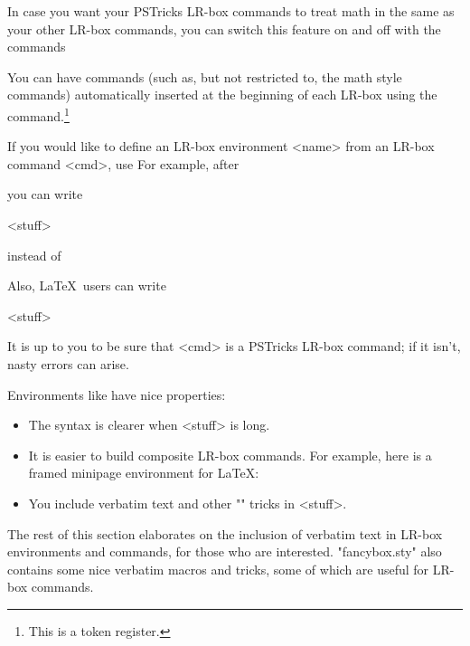   In case you want your PSTricks LR-box commands to treat math in the same as
your other LR-box commands, you can switch this feature on and off with the
commands
\begin{Ex}
  \object  \psmathboxtrue
  \object  \psmathboxfalse
\end{Ex}

You can  have commands (such as, but not restricted to, the math style
commands) automatically inserted at the beginning of each LR-box using the
  \Mac  {}
command.\footnote{This is a token register.}

If you would like to define an LR-box environment <name> from an LR-box
command <cmd>, use
  \Mac  {}
For example, after
\begin{LVerbatim}
\end{LVerbatim}
you can write
\begin{LVerbatim}
  \MyFrame <stuff>\endMyFrame
\end{LVerbatim}
instead of
\begin{LVerbatim}
\end{LVerbatim}
Also, \LaTeX\ users can write
\begin{LVerbatim}
  \begin{MyFrame} <stuff>\end{MyFrame}
\end{LVerbatim}
It is up to you to be sure that <cmd> is a PSTricks LR-box command; if it
isn't, nasty errors can arise.

Environments like have nice properties:
\begin{itemize}
  \item The syntax is clearer when <stuff> is long.
  \item It is easier to build composite LR-box commands. For example, here is
a framed minipage environment for \LaTeX:
\begin{LVerb}
  \newenvironment{fminipage}%
    {\MyFrame\begin{minipage}}%
    {\end{minipage}\endMyFrame}
\end{LVerb}
  \item You include verbatim text and other "\catcode" tricks in <stuff>.
\end{itemize}

The rest of this section elaborates on the inclusion of verbatim text in
LR-box environments and commands, for those who are interested. "fancybox.sty"
also contains some nice verbatim macros and tricks, some of which are useful
for LR-box commands.

